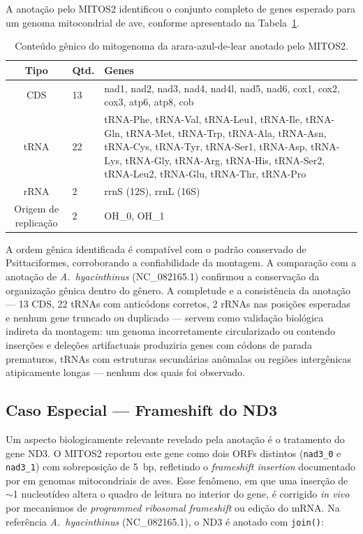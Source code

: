 A anotação pelo MITOS2 identificou o conjunto completo de genes esperado para um genoma mitocondrial de ave, conforme apresentado na Tabela~\ref{tab:anotacao}.

\begin{table}[H]
\centering
\caption{Conteúdo gênico do mitogenoma da arara-azul-de-lear anotado pelo MITOS2.}
\label{tab:anotacao}
\begin{tabular}{@{}clp{9.5cm}@{}}
\toprule
\textbf{Tipo} & \textbf{Qtd.} & \textbf{Genes} \\
\midrule
CDS & 13 & nad1, nad2, nad3, nad4, nad4l, nad5, nad6, cox1, cox2, cox3, atp6, atp8, cob \\
\addlinespace
tRNA & 22 & tRNA-Phe, tRNA-Val, tRNA-Leu1, tRNA-Ile, tRNA-Gln, tRNA-Met, tRNA-Trp, tRNA-Ala, tRNA-Asn, tRNA-Cys, tRNA-Tyr, tRNA-Ser1, tRNA-Asp, tRNA-Lys, tRNA-Gly, tRNA-Arg, tRNA-His, tRNA-Ser2, tRNA-Leu2, tRNA-Glu, tRNA-Thr, tRNA-Pro \\
\addlinespace
rRNA & 2 & rrnS (12S), rrnL (16S) \\
\addlinespace
Origem de replicação & 2 & OH\_0, OH\_1 \\
\bottomrule
\end{tabular}
\end{table}

A ordem gênica identificada é compatível com o padrão conservado de Psittaciformes, corroborando a confiabilidade da montagem. A comparação com a anotação de \textit{A.~hyacinthinus} (NC\_082165.1) confirmou a conservação da organização gênica dentro do gênero. A completude e a consistência da anotação --- 13 CDS, 22 tRNAs com anticódons corretos, 2 rRNAs nas posições esperadas e nenhum gene truncado ou duplicado --- servem como validação biológica indireta da montagem: um genoma incorretamente circularizado ou contendo inserções e deleções artifactuais produziria genes com códons de parada prematuros, tRNAs com estruturas secundárias anômalas ou regiões intergênicas atipicamente longas --- nenhum dos quais foi observado.

\subsection{Caso Especial --- Frameshift do ND3}

Um aspecto biologicamente relevante revelado pela anotação é o tratamento do gene ND3. O MITOS2 reportou este gene como dois ORFs distintos (\texttt{nad3\_0} e \texttt{nad3\_1}) com sobreposição de 5~bp, refletindo o \textit{frameshift insertion} documentado por  em genomas mitocondriais de aves. Esse fenômeno, em que uma inserção de $\sim$1 nucleotídeo altera o quadro de leitura no interior do gene, é corrigido \textit{in vivo} por mecanismos de \textit{programmed ribosomal frameshift} ou edição do mRNA. Na referência \textit{A.~hyacinthinus} (NC\_082165.1), o ND3 é anotado com \texttt{join()}:


